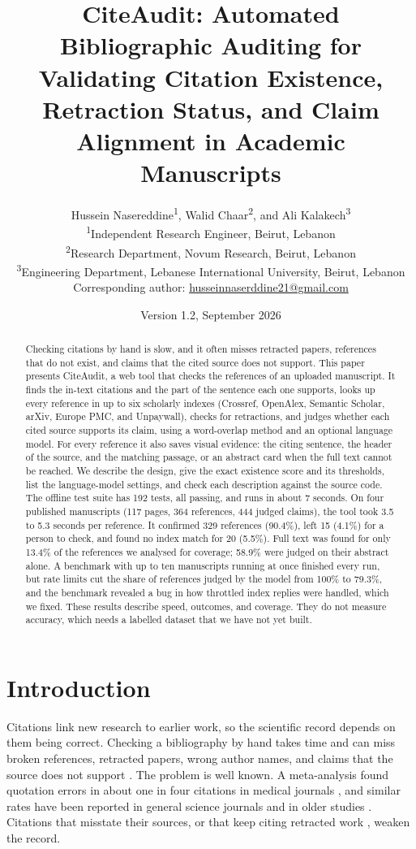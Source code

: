 \documentclass{article}
\title{CiteAudit: Automated Bibliographic Auditing for Validating Citation Existence, Retraction Status, and Claim Alignment in Academic Manuscripts}
\author{%
Hussein Nasereddine\textsuperscript{1}, Walid Chaar\textsuperscript{2}, and Ali Kalakech\textsuperscript{3}\\[6pt]
\small\textsuperscript{1}Independent Research Engineer, Beirut, Lebanon\\
\small\textsuperscript{2}Research Department, Novum Research, Beirut, Lebanon\\
\small\textsuperscript{3}Engineering Department, Lebanese International University, Beirut, Lebanon\\
\small Corresponding author: \href{mailto:husseinnaserddine21@gmail.com}{husseinnaserddine21@gmail.com}%
}
\date{Version 1.2, September 2026}
\begin{document}
\maketitle

\begin{abstract}
Checking citations by hand is slow, and it often misses retracted papers, references that do not exist, and claims that the cited source does not support. This paper presents CiteAudit, a web tool that checks the references of an uploaded manuscript. It finds the in-text citations and the part of the sentence each one supports, looks up every reference in up to six scholarly indexes (Crossref, OpenAlex, Semantic Scholar, arXiv, Europe PMC, and Unpaywall), checks for retractions, and judges whether each cited source supports its claim, using a word-overlap method and an optional language model. For every reference it also saves visual evidence: the citing sentence, the header of the source, and the matching passage, or an abstract card when the full text cannot be reached. We describe the design, give the exact existence score and its thresholds, list the language-model settings, and check each description against the source code. The offline test suite has 192 tests, all passing, and runs in about 7 seconds. On four published manuscripts (117 pages, 364 references, 444 judged claims), the tool took 3.5 to 5.3 seconds per reference. It confirmed 329 references (90.4\%), left 15 (4.1\%) for a person to check, and found no index match for 20 (5.5\%). Full text was found for only 13.4\% of the references we analysed for coverage; 58.9\% were judged on their abstract alone. A benchmark with up to ten manuscripts running at once finished every run, but rate limits cut the share of references judged by the model from 100\% to 79.3\%, and the benchmark revealed a bug in how throttled index replies were handled, which we fixed. These results describe speed, outcomes, and coverage. They do not measure accuracy, which needs a labelled dataset that we have not yet built.
\end{abstract}

\section{Introduction}
\label{sec:intro}

Citations link new research to earlier work, so the scientific record depends on them being correct. Checking a bibliography by hand takes time and can miss broken references, retracted papers, wrong author names, and claims that the source does not support \cite{ref1}. The problem is well known. A meta-analysis found quotation errors in about one in four citations in medical journals \cite{jergas2015,mogull2017}, and similar rates have been reported in general science journals \cite{smith2020} and in older studies \cite{delacey1985,evans1990}. Citations that misstate their sources, or that keep citing retracted work \cite{hsiao2021,schneider2020}, weaken the record.
\end{document}
